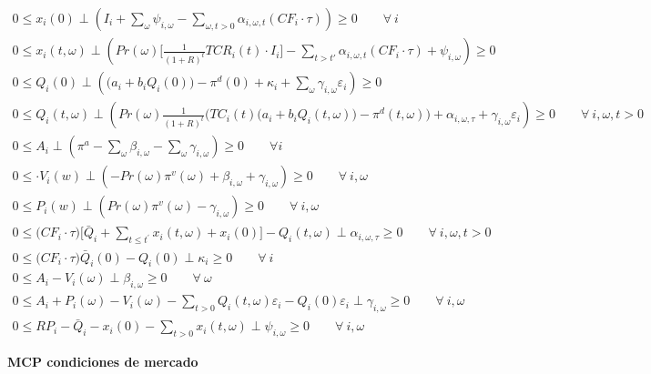 \begin{footnotesize}
\begin{align}
    0 \leq x_i(0) \perp (I_i  + \sum_{\omega}\psi_{i,\omega} -\sum_{\omega, t>0} \alpha_{i,\omega,t}(CF_i\cdot \tau)) \geq 0 \qquad \forall \  i \\
    0 \leq x_i(t,\omega) \perp (Pr(\omega) \Bigg[\frac{1}{(1+R)^t}TCR_i(t) \cdot I_i \Bigg] - \sum_{t> t\prime}\alpha_{i,\omega,t} ( CF_i \cdot \tau)+ \psi_{i,\omega}) \geq 0\\
    0 \leq Q_i(0) \perp ( \big(a_{i}+b_i Q_{i}(0)\big)-\pi^d(0) + \kappa_i  + \sum_{\omega} \gamma_{i,\omega}\varepsilon_i) \geq 0\\
    0 \leq Q_i(t,\omega) \perp (Pr(\omega)  \frac{1}{(1+R)^t} \bigg( TC_i(t) \big(a_{i}+b_i Q_i(t,\omega)\big ) -\pi^d(t,\omega) \bigg) + \alpha_{i,\omega,\tau} + \gamma_{i,\omega} \varepsilon_{i}) \geq 0 \qquad \forall \ i, \omega, t > 0\\
    0 \leq A_i \perp (\pi^{a} - \sum_{\omega}\beta_{i,\omega} - \sum_{\omega}\gamma_{i,\omega}) \geq 0 \qquad \forall  i\\
    0 \leq \cdot  V_i(w) \perp (-Pr(\omega) \pi^v(\omega) + \beta_{i,\omega}  + \gamma_{i,\omega})\geq 0 \qquad \forall \  i, \omega
        \end{align}
    \begin{align}
   0 \leq  P_i(w) \perp (Pr(\omega) \pi^v(\omega) -\gamma_{i,\omega}) \geq  0  \qquad \forall \  i, \omega \\
     0 \leq \big(CF_i \cdot \tau \big) \Bigg[\bar{Q}_i + \sum_{t\leq t^{\prime}} x_i(t,\omega) + x_i(0) \Bigg] - Q_i(t,\omega)  \perp \alpha_{i,\omega,\tau} \geq 0 \qquad \forall \ i, \omega, t  > 0\\
     0 \leq \Big(CF_i\cdot\tau \Big)\bar{Q}_i(0)-Q_{i}(0) \perp \kappa_i \geq 0 \qquad \forall \ i \\
     0 \leq  A_{i} - V_i(\omega) \perp \beta_{i,\omega} \geq 0 \qquad \forall  \ \omega \\
     0 \leq  A_{i} + P_{i} (\omega) - V_i(\omega) - \sum_{t>0} Q_i(t,\omega) \varepsilon_{i} -Q_i(0)\varepsilon_{i} \perp \gamma_{i,\omega} \geq 0 \qquad \forall \ i, \omega\\
     0 \leq  RP_i - \bar{Q}_i - x_i(0) - \sum_{t>0} x_i(t,\omega) \perp \psi_{i,\omega} \geq 0 \qquad \forall \ i,\omega 
\end{align}
\end{footnotesize}

\textbf{MCP condiciones de mercado}

